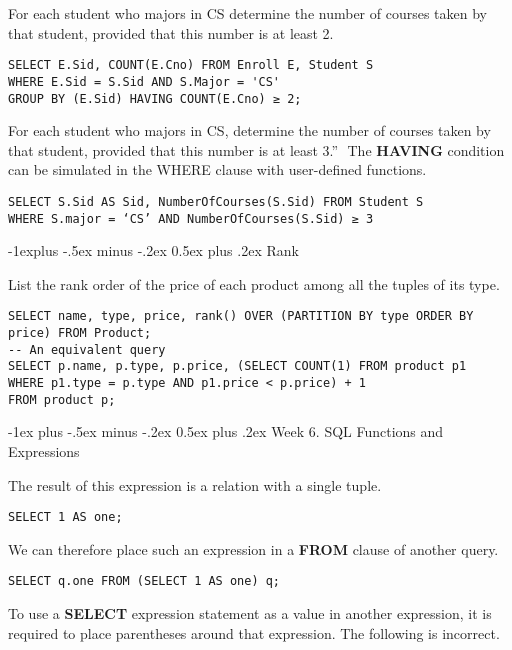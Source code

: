 \documentclass[10pt,landscape]{article}
\makeatletter
\newcommand{\sql}[1]{{\color{cyan} \textbf{#1}}}
\renewcommand{\section}{\@startsection{section}{1}{0mm}%
                                {-1ex plus -.5ex minus -.2ex}%
                                {0.5ex plus .2ex}%
                                {\normalfont\large\bfseries}}
\renewcommand{\subsection}{\@startsection{subsection}{2}{0mm}%
                                {-1explus -.5ex minus -.2ex}%
                                {0.5ex plus .2ex}%
                                {\normalfont\normalsize\bfseries}}
\makeatother
\begin{document}
\begin{multicols}{4}
For each student who majors in CS determine the number of courses taken by that student, provided that this number is at least 2.

\begin{lstlisting}
SELECT E.Sid, COUNT(E.Cno) FROM Enroll E, Student S
WHERE E.Sid = S.Sid AND S.Major = 'CS'
GROUP BY (E.Sid) HAVING COUNT(E.Cno) ≥ 2;	
\end{lstlisting}

For each student who majors in CS, determine the number of courses taken by that student, provided that this number is at least 3.”

The \sql{HAVING} condition can be simulated in the WHERE clause with user-defined functions.

\begin{lstlisting}
SELECT S.Sid AS Sid, NumberOfCourses(S.Sid) FROM Student S
WHERE S.major = ‘CS’ AND NumberOfCourses(S.Sid) ≥ 3
\end{lstlisting}

\subsection{Rank}

List the rank order of the price of each product among all the tuples of its type.

\begin{lstlisting}
SELECT name, type, price, rank() OVER (PARTITION BY type ORDER BY price) FROM Product;
-- An equivalent query
SELECT p.name, p.type, p.price, (SELECT COUNT(1) FROM product p1
WHERE p1.type = p.type AND p1.price < p.price) + 1
FROM product p;
\end{lstlisting}

\section{Week 6. SQL Functions and Expressions}

The result of this expression is a relation with a single tuple.

\begin{lstlisting}
SELECT 1 AS one;	
\end{lstlisting}

We can therefore place such an expression in a \sql{FROM}
clause of another query.

\begin{lstlisting}
SELECT q.one FROM (SELECT 1 AS one) q;
\end{lstlisting}

To use a \sql{SELECT} expression statement as a value in another expression, it is required to place parentheses around that expression. The following is incorrect.


\end{multicols}
\end{document}
